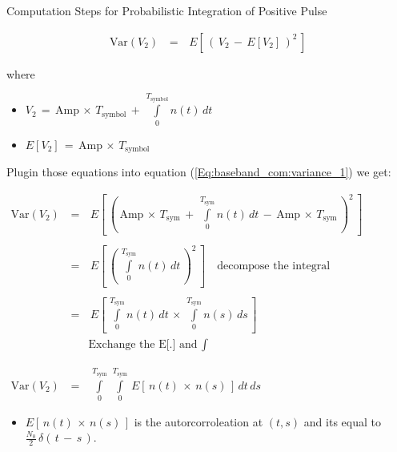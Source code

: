 \documentclass{Beamer}
\begin{document}
\begin{frame}[t,allowframebreaks]{Computation Steps for Probabilistic Integration of Positive Pulse}
\begin{enumerate}
$$\begin{array}{rcl}
\text{Var}(V_2) \, &=& \, E \left[\,  \left(\, V_2 \, - \, E[V_2]\, \right)^2  \,\right]
\label{Eq:baseband_com:variance_1}
\end{array}$$

where 

\begin{itemize}
\item $V_2 \, = \,  \text{Amp}\, \times \, T_{\text{symbol}} \, + \,   \displaystyle\int\limits_{0}^{T_{\text{symbol}}}n(t)  \, dt $

\item $E[V_2] \, = \,  \text{Amp}\, \times \, T_{\text{symbol}}$ 
\end{itemize}

Plugin those equations into equation (\autoref{Eq:baseband_com:variance_1}) we get:
 
\newpage

$\begin{array}{rcl}
\text{Var}(V_2) \,&=& \, E \left[\,  \left(\, \text{Amp}\, \times \, T_{\text{sym}} \, + \,   \displaystyle\int\limits_{0}^{T_{\text{sym}}}n(t)  \, dt \,  - \, \text{Amp}\, \times \, T_{\text{sym}} \, \right)^2  \,\right] \\ \\
&=& \, E \left[\, \left(\, \displaystyle\int\limits_{0}^{T_{\text{sym}}}n(t)  \, dt \, \right)^2  \,\right] \quad \text{decompose the integral} \\ \\
&=& \, E \left[\,  \displaystyle\int\limits_{0}^{T_{\text{sym}}}n(t)  \, dt \,  \times \, \displaystyle\int\limits_{0}^{T_{\text{sym}}}n(s)  \, ds   \,\right]\\ && \text{Exchange the E[.] and } \int 
\label{Eq:baseband_com:variance_2}
\end{array}$

\newpage
$\begin{array}{rcl}
\text{Var}(V_2) \,&=& \, \displaystyle\int\limits_{0}^{T_{\text{sym}}} \, \displaystyle\int\limits_{0}^{T_{\text{sym}}} \,  E \left[\,  n(t)  \, \times \, n(s)   \,\right] \, dt \, ds  
\end{array}$

\begin{itemize}
\item  $E \left[\,  n(t)  \, \times \, n(s)   \,\right]$ is the autorcorroleation at $(t,s)$ and its equal to $\displaystyle\frac{N_0}{2} \, \delta(\, t \, - \, s \,)$. 
\end{itemize}




\end{enumerate}
\end{frame}
\end{document}
